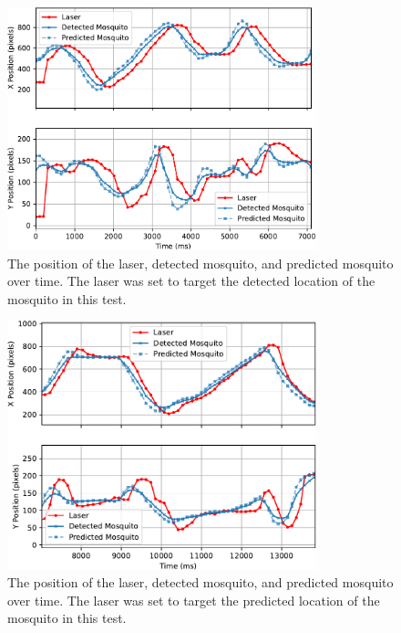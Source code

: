 \begin{figure}[h]
  \centering
  \includegraphics[width=0.8\textwidth]{figures/results/q1_1mos_detection_10fps.pdf}
  \caption{The position of the laser, detected mosquito, and predicted mosquito over time. The laser was set to target the detected location of the mosquito in this test.}
  \label{fig:q1_1mos_detection_10fps}
\end{figure}

\begin{figure}[h]
  \centering
  \includegraphics[width=0.8\textwidth]{figures/results/q1_1mos_prediction_10fps.pdf}
  \caption{The position of the laser, detected mosquito, and predicted mosquito over time. The laser was set to target the predicted location of the mosquito in this test.}
  \label{fig:q1_1mos_prediction_10fps}
\end{figure}

